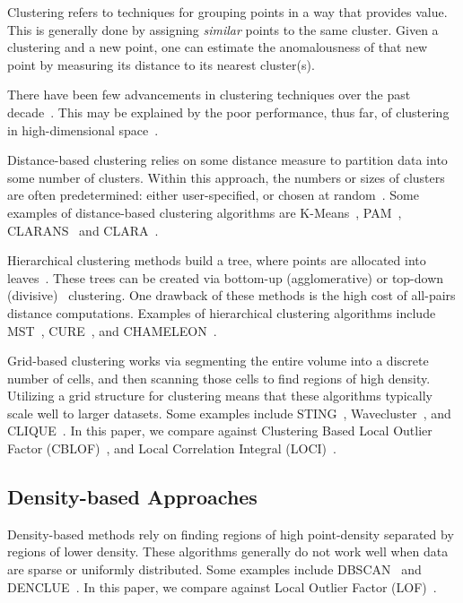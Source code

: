 Clustering refers to techniques for grouping points in a way that provides value.
This is generally done by assigning \textit{similar} points to the same cluster.
Given a clustering and a new point, one can estimate the anomalousness of that new point by measuring its distance to its nearest cluster(s).

There have been few advancements in clustering techniques over the past decade~\cite{wang2019progress}.
This may be explained by the poor performance, thus far, of clustering in high-dimensional space~\cite{zhang2013advancements}.

Distance-based clustering relies on some distance measure to partition data into some number of clusters.
Within this approach, the numbers or sizes of clusters are often predetermined: either user-specified, or chosen at random~\cite{wang2019progress}.
Some examples of distance-based clustering algorithms are
K-Means~\cite{macqueen1967some},
PAM~\cite{kaufman2009finding},
CLARANS~\cite{ng1994efficient} and
CLARA~\cite{kaufman2009finding}.

Hierarchical clustering methods build a tree, where points are allocated into leaves~\cite{wang2019progress}.
These trees can be created via bottom-up (agglomerative) or top-down (divisive)~\cite{agrawal1998automatic} clustering.
One drawback of these methods is the high cost of all-pairs distance computations.
Examples of hierarchical clustering algorithms include
MST~\cite{zahn1971graph},
CURE~\cite{guha1998cure}, and
CHAMELEON~\cite{karypis1999hierarchical}.

Grid-based clustering works via segmenting the entire volume into a discrete number of cells, and then scanning those cells to find regions of high density.
Utilizing a grid structure for clustering means that these algorithms typically scale well to larger datasets.
Some examples include
STING~\cite{wang1997sting},
Wavecluster~\cite{sheikholeslami2000wavecluster}, and
CLIQUE~\cite{agrawal1998automatic}.
In this paper, we compare against Clustering Based Local Outlier Factor (CBLOF)~\cite{he2003cblof}, and
Local Correlation Integral (LOCI)~\cite{papadimitriou2003loci}.


\subsection{Density-based Approaches}
\label{subsec:introduction:density-based-approaches}

Density-based methods rely on finding regions of high point-density separated by regions of lower density.
These algorithms generally do not work well when data are sparse or uniformly distributed.
Some examples include
DBSCAN~\cite{ester1996density} and
DENCLUE~\cite{hinneburg1998efficient}.
In this paper, we compare against Local Outlier Factor (LOF)~\cite{breunig2000lof}.


